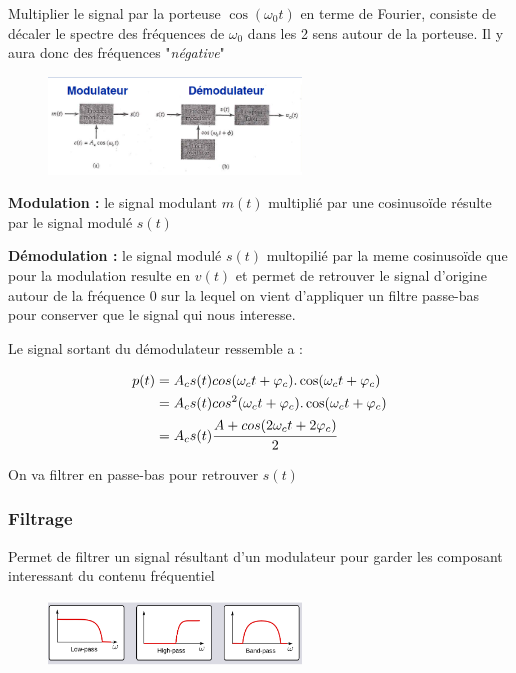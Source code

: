 \documentclass[12pt]{article}
\begin{document}
		Multiplier le signal par la porteuse $\cos(\omega_0 t)$ en terme de Fourier, consiste de décaler le spectre des fréquences de $\omega_0$ dans les 2 sens autour de la porteuse. Il y aura donc des fréquences "\textit{négative}"
			
		\begin{figure}[htp]
			\centering
			\includegraphics[width=0.6\textwidth]{img/modulationAM3.png}
		\end{figure}
		
		\textbf{Modulation :} le signal modulant $m(t)$ multiplié par une cosinusoïde résulte par le signal modulé $s(t)$
	
		\textbf{Démodulation :} le signal modulé $s(t)$ multopilié par la meme cosinusoïde que pour la modulation resulte en $v(t)$ et permet de retrouver le signal d'origine autour de la fréquence 0 sur la lequel on vient d'appliquer un filtre passe-bas pour conserver que le signal qui nous interesse.
			
			
		Le signal sortant du démodulateur ressemble a :
		
		\begin{equation} \label{eq1}
			\begin{split}
				p(t) &= A_c s(t) cos (\omega_c t + \varphi_c).\cos(\omega_c t + \varphi_c)\\
				&= A_c s(t) cos^2 (\omega_c t + \varphi_c).\cos(\omega_c t + \varphi_c)\\
				&= A_c s(t) \cfrac{A + cos(2\omega_c t + 2\varphi_c)}{2}
			\end{split}
		\end{equation}
		
		On va filtrer en passe-bas pour retrouver $s(t)$
		
		\subsubsection{Filtrage}
			Permet de filtrer un signal résultant d'un modulateur pour garder les composant interessant du contenu fréquentiel
			
			\begin{figure}[htp]
			\centering
			\includegraphics[width=0.6\textwidth]{img/filtrage.png}
			\end{figure}
			
\end{document}
